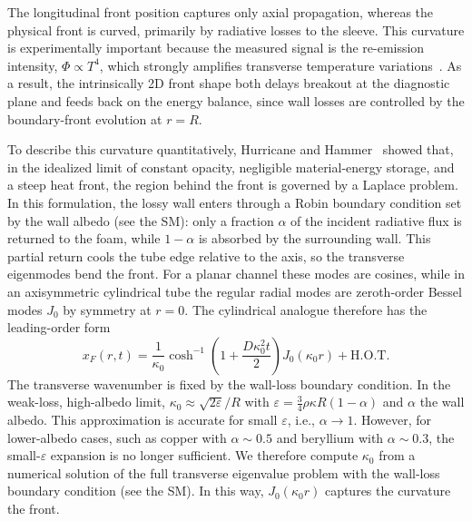 \documentclass[prl, twocolumn, superscriptaddress, amsmath, amssymb, reprint]{revtex4-2}
\begin{document}
The longitudinal front position captures only axial propagation, whereas the physical front is curved, primarily by radiative losses to the sleeve. This curvature is experimentally important because the measured signal is the re-emission intensity, $\Phi\propto T^4$, which strongly amplifies transverse temperature variations~\cite{Back2000POP,Back2000PRL}. As a result, the intrinsically 2D front shape both delays breakout at the diagnostic plane and feeds back on the energy balance, since wall losses are controlled by the boundary-front evolution at $r=R$.

To describe this curvature quantitatively, Hurricane and Hammer~\cite{Hurricane2006} showed that, in the idealized limit of constant opacity, negligible material-energy storage, and a steep heat front, the region behind the front is governed by a Laplace problem. In this formulation, the lossy wall enters through a Robin boundary condition set by the wall albedo (see the SM): only a fraction $\alpha$ of the incident radiative flux is returned to the foam, while $1-\alpha$ is absorbed by the surrounding wall. This partial return cools the tube edge relative to the axis, so the transverse eigenmodes bend the front. For a planar channel these modes are cosines, while in an axisymmetric cylindrical tube the regular radial modes are zeroth-order Bessel modes $J_0$ by symmetry at $r=0$. The cylindrical analogue therefore has the leading-order form~\cite{Courtois2022}
\begin{equation}\label{eq:HH_cyl}
    x_F(r,t) = \frac{1}{\kappa_0}\cosh^{-1}\!\left(1 + \frac{D\kappa_0^2 t}{2}\right)J_0(\kappa_0 r) + \text{H.O.T.}
\end{equation}
The transverse wavenumber is fixed by the wall-loss boundary condition. In the weak-loss, high-albedo limit, $\kappa_0 \approx \sqrt{2\varepsilon}/R$ with $\varepsilon = \tfrac{3}{4}\rho\kappa R(1-\alpha)$ and $\alpha$ the wall albedo. This approximation is accurate for small $\varepsilon$, i.e., $\alpha\to1$. However, for lower-albedo cases, such as copper with $\alpha\sim0.5$ and beryllium with $\alpha\sim0.3$, the small-$\varepsilon$ expansion is no longer sufficient. We therefore compute $\kappa_0$ from a numerical solution of the full transverse eigenvalue problem with the wall-loss boundary condition (see the SM). In this way, $J_0(\kappa_0 r)$ captures the curvature the front.
\end{document}
